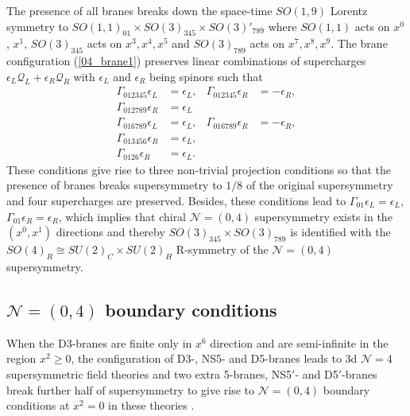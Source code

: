 \documentclass{article}
\numberwithin{equation}{section}
\begin{document}
The presence of all branes breaks down the space-time $SO(1,9)$ Lorentz symmetry to 
$SO(1,1)_{01}\times SO(3)_{345}\times SO(3)'_{789}$ 
where $SO(1,1)$ acts on $x^{0}$, $x^{1}$, 
$SO(3)_{345}$ acts on $x^{3}, x^{4}, x^{5}$ 
and $SO(3)_{789}$ acts on $x^{7}, x^{8}, x^{9}$. 
The brane configuration (\ref{04_brane1}) preserves linear combinations of supercharges 
$\epsilon_{L}\mathcal{Q}_{L}+\epsilon_{R}\mathcal{Q}_{R}$ 
with $\epsilon_{L}$ and $\epsilon_{R}$ being spinors such that 
\begin{align}
\label{NS_SUSY1}
\Gamma_{012345}\epsilon_{L}&=\epsilon_{L}, & 
\Gamma_{012345}\epsilon_{R}&=-\epsilon_{R}, \\
\label{D5_SUSY2}
\Gamma_{012789}\epsilon_{R}&=\epsilon_{L}\\
\label{NS'_SUSY3}
\Gamma_{016789}\epsilon_{L}&=\epsilon_{L}, &
\Gamma_{016789}\epsilon_{R}&=-\epsilon_{R}, \\
\label{D5'_SUSY}
\Gamma_{013456}\epsilon_{R}&=\epsilon_{L}, \\
\label{D3_SUSY}
\Gamma_{0126}\epsilon_{R}&=\epsilon_{L}. 
\end{align}
These conditions give rise to three non-trivial projection conditions 
so that the presence of branes breaks supersymmetry to $1/8$ of the original supersymmetry 
and four supercharges are preserved. 
Besides, these conditions lead to 
$\Gamma_{01}\epsilon_{L}=\epsilon_{L}$, 
$\Gamma_{01}\epsilon_{R}=\epsilon_{R}$, 
which implies that chiral $\mathcal{N}=(0,4)$ supersymmetry exists in the $(x^{0}, x^{1})$ directions 
and thereby $SO(3)_{345}\times SO(3)_{789}$ is identified with the $SO(4)_{R}\cong SU(2)_{C}\times SU(2)_{H}$ R-symmetry 
of the $\mathcal{N}=(0,4)$ supersymmetry. 












\subsection{$\mathcal{N}=(0,4)$ boundary conditions}
\label{sec_04bc}
When the D3-branes are finite only in $x^{6}$ direction and are semi-infinite in the region $x^2\ge 0$, 
the configuration of D3-, NS5- and D5-branes leads to 3d $\mathcal{N}=4$ supersymmetric field theories 
and two extra 5-branes, NS5$'$- and D5$'$-branes break further half of supersymmetry 
to give rise to $\mathcal{N}=(0,4)$ boundary conditions at $x^2=0$ in these theories 
\cite{Chung:2016pgt}. 
\end{document}
